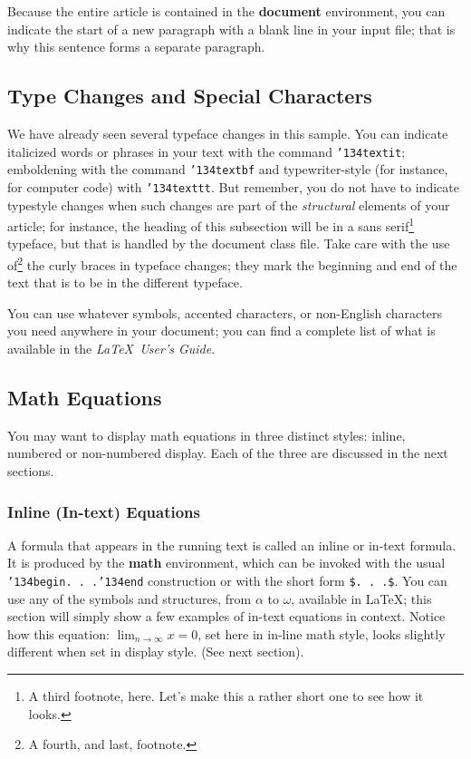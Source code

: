 \documentclass{sigkddExp}
\begin{document}
Because the entire article is contained in
the \textbf{document} environment, you can indicate the
start of a new paragraph with a blank line in your
input file; that is why this sentence forms a separate paragraph.

\subsection{Type Changes and Special Characters}
We have already seen several typeface changes in this sample.  You
can indicate italicized words or phrases in your text with
the command \texttt{{\char'134}textit}; emboldening with the
command \texttt{{\char'134}textbf}
and typewriter-style (for instance, for computer code) with
\texttt{{\char'134}texttt}.  But remember, you do not
have to indicate typestyle changes when such changes are
part of the \textit{structural} elements of your
article; for instance, the heading of this subsection will
be in a sans serif\footnote{A third footnote, here.
Let's make this a rather short one to
see how it looks.} typeface, but that is handled by the
document class file. Take care with the use
of\footnote{A fourth, and last, footnote.}
the curly braces in typeface changes; they mark
the beginning and end of
the text that is to be in the different typeface.

You can use whatever symbols, accented characters, or
non-English characters you need anywhere in your document;
you can find a complete list of what is
available in the \textit{\LaTeX\
User's Guide}\cite{Lamport:LaTeX}.

\subsection{Math Equations}
You may want to display math equations in three distinct styles:
inline, numbered or non-numbered display.  Each of
the three are discussed in the next sections.

\subsubsection{Inline (In-text) Equations}
A formula that appears in the running text is called an
inline or in-text formula.  It is produced by the
\textbf{math} environment, which can be
invoked with the usual \texttt{{\char'134}begin. . .{\char'134}end}
construction or with the short form \texttt{\$. . .\$}. You
can use any of the symbols and structures,
from $\alpha$ to $\omega$, available in
\LaTeX\cite{Lamport:LaTeX}; this section will simply show a
few examples of in-text equations in context. Notice how
this equation: \begin{math}\lim_{n\rightarrow \infty}x=0\end{math},
set here in in-line math style, looks slightly different when
set in display style.  (See next section).
\end{document}
